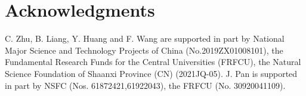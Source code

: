 \documentclass[letterpaper]{article} \usepackage{aaai22}  \usepackage{times}  \usepackage{helvet}  \usepackage{courier}  \usepackage[hyphens]{url}  \usepackage{graphicx} \urlstyle{rm} \def\UrlFont{\rm}  \usepackage{natbib}  \usepackage{caption} \DeclareCaptionStyle{ruled}{labelfont=normalfont,labelsep=colon,strut=off} \frenchspacing  \setlength{\pdfpagewidth}{8.5in}  \setlength{\pdfpageheight}{11in}  \newcommand{\hang}{\textcolor[rgb]{0.98,0.5,0.04}}
\begin{document}
\section{Acknowledgments}
C. Zhu, B. Liang, Y. Huang and F. Wang are supported in part by National Major Science and Technology Projects of China (No.2019ZX01008101), the Fundamental Research Funds for the Central Universities (FRFCU), the Natural Science Foundation of Shaanxi Province (CN) (2021JQ-05). 
J. Pan is supported in part by NSFC (Nos. 61872421,61922043), the FRFCU (No. 30920041109).


\end{document}
